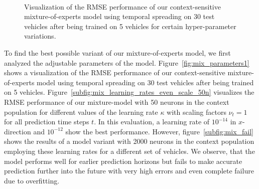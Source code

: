 \begin{figure}[t]
    \centering
    \\
    \caption{Visualization of the \ac{RMSE} performance of our context-sensitive mixture-of-experts model using temporal spreading on \num{30} test vehicles after being trained on \num{5} vehicles for certain hyper-parameter variations.}
    \label{fig:mix_parameters2}
\end{figure}

To find the best possible variant of our mixture-of-experts model, we first analyzed the adjustable parameters of the model. 
Figure~\ref{fig:mix_parameters1} shows a visualization of the \ac{RMSE} performance of our context-sensitive mixture-of-experts model using temporal spreading on \num{30} test vehicles after being trained on \num{5} vehicles.
Figure~\ref{subfig:mix_learning_rates_even_scale_50n} visualizes the \ac{RMSE} performance of our mixture-model with \num{50} neurons in the context population for different values of the learning rate $\kappa$ with scaling factors $\nu_{t}=1$ for all prediction time steps $t$.
In this evaluation, a learning rate of $10^{-14}$ in $x$-direction and $10^{-12}$ show the best performance.
However, figure~\ref{subfig:mix_fail} shows the results of a model variant with \num{2000} neurons in the context population employing these learning rates for a different set of vehicles.
We observe, that the model performs well for earlier prediction horizons but fails to make accurate prediction further into the future with very high errors and even complete failure due to overfitting.

